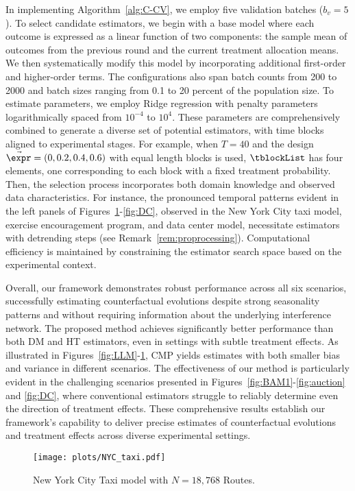 In implementing Algorithm~\ref{alg:C-CV}, we employ five validation batches ($b_v=5$). 
To select candidate estimators, we begin with a base model where each outcome is expressed as a linear function of two components: the sample mean of outcomes from the previous round and the current treatment allocation means. We then systematically modify this model by incorporating additional first-order and higher-order terms. The configurations also span batch counts from 200 to 2000 and batch sizes ranging from 0.1 to 20 percent of the population size. To estimate parameters, we employ Ridge regression with penalty parameters logarithmically spaced from $10^{-4}$ to $10^{4}$. These parameters are comprehensively combined to generate a diverse set of potential estimators, with time blocks aligned to experimental stages. For example, when $T=40$ and the design $\Vec{\expr} = (0, 0.2, 0.4, 0.6)$ with equal length blocks is used, 
$\tblockList$ has four elements, one corresponding to each block with a fixed treatment probability.
Then, the selection process incorporates both domain knowledge and observed data characteristics. For instance, the pronounced temporal patterns evident in the left panels of Figures~\ref{fig:NYC_taxi}-\ref{fig:DC}, observed in the New York City taxi model, exercise encouragement program, and data center model, necessitate estimators with detrending steps (see Remark~\ref{rem:proprocessing}). Computational efficiency is maintained by constraining the estimator search space based on the experimental context.

Overall, our framework demonstrates robust performance across all six scenarios, successfully estimating counterfactual evolutions despite strong seasonality patterns and without requiring information about the underlying interference network. The proposed method achieves significantly better performance than both DM and HT estimators, even in settings with subtle treatment effects. As illustrated in Figures~\ref{fig:LLM}-\ref{fig:NYC_taxi}, CMP yields estimates with both smaller bias and variance in different scenarios. The effectiveness of our method is particularly evident in the challenging scenarios presented in Figures~\ref{fig:BAM1}-\ref{fig:auction} and \ref{fig:DC}, where conventional estimators struggle to reliably determine even the direction of treatment effects. These comprehensive results establish our framework's capability to deliver precise estimates of counterfactual evolutions and treatment effects across diverse experimental settings.

\begin{figure}
    \centering
    \texttt{[image: plots/NYC\_taxi.pdf]}
    \caption{New York City Taxi model with $N=18,768$ Routes.}
    \label{fig:NYC_taxi}
\end{figure}


